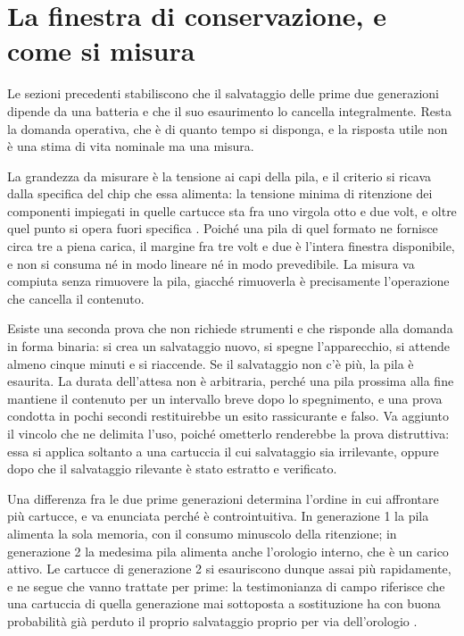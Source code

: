 \section{La finestra di conservazione, e come si misura}

Le sezioni precedenti stabiliscono che il salvataggio delle prime due generazioni dipende da una batteria e che il suo esaurimento lo cancella integralmente. Resta la domanda operativa, che è di quanto tempo si disponga, e la risposta utile non è una stima di vita nominale ma una misura.

La grandezza da misurare è la tensione ai capi della pila, e il criterio si ricava dalla specifica del chip che essa alimenta: la tensione minima di ritenzione dei componenti impiegati in quelle cartucce sta fra uno virgola otto e due volt, e oltre quel punto si opera fuori specifica \cite{insidegadgets-canale}. Poiché una pila di quel formato ne fornisce circa tre a piena carica, il margine fra tre volt e due è l'intera finestra disponibile, e non si consuma né in modo lineare né in modo prevedibile. La misura va compiuta senza rimuovere la pila, giacché rimuoverla è precisamente l'operazione che cancella il contenuto.

Esiste una seconda prova che non richiede strumenti e che risponde alla domanda in forma binaria: si crea un salvataggio nuovo, si spegne l'apparecchio, si attende almeno cinque minuti e si riaccende. Se il salvataggio non c'è più, la pila è esaurita. La durata dell'attesa non è arbitraria, perché una pila prossima alla fine mantiene il contenuto per un intervallo breve dopo lo spegnimento, e una prova condotta in pochi secondi restituirebbe un esito rassicurante e falso. Va aggiunto il vincolo che ne delimita l'uso, poiché ometterlo renderebbe la prova distruttiva: essa si applica soltanto a una cartuccia il cui salvataggio sia irrilevante, oppure dopo che il salvataggio rilevante è stato estratto e verificato.

Una differenza fra le due prime generazioni determina l'ordine in cui affrontare più cartucce, e va enunciata perché è controintuitiva. In generazione 1 la pila alimenta la sola memoria, con il consumo minuscolo della ritenzione; in generazione 2 la medesima pila alimenta anche l'orologio interno, che è un carico attivo. Le cartucce di generazione 2 si esauriscono dunque assai più rapidamente, e ne segue che vanno trattate per prime: la testimonianza di campo riferisce che una cartuccia di quella generazione mai sottoposta a sostituzione ha con buona probabilità già perduto il proprio salvataggio proprio per via dell'orologio \cite{insidegadgets-canale}.

